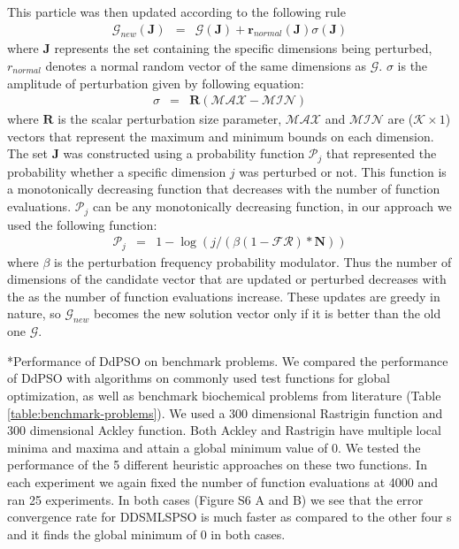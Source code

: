 \documentclass[12pt]{article}
\makeatletter
\renewcommand\subsection{\@startsection
	{subsection}{2}{0mm}
	{-0.05in}
	{-0.5\baselineskip}
	{\normalfont\normalsize\bfseries}}
\makeatother
\begin{document}
This particle was then updated according to the following rule
\begin{eqnarray}
	\mathcal{G}_{new}(\mathbf{J})& = &\mathcal{G}(\mathbf{J})+\mathbf{r}_{normal}(\mathbf{J})\sigma(\mathbf{J})
\end{eqnarray}
where $\mathbf{J}$ represents the set containing the specific dimensions being perturbed, ${r}_{normal}$ denotes a normal random vector of the same dimensions as $\mathcal{G}$. $\sigma$ is the amplitude of perturbation given by following equation:
\begin{eqnarray}
	\sigma& = &\mathbf{R}(\mathcal{MAX} -\mathcal{MIN})
\end{eqnarray}
where $\mathbf{R}$ is the scalar perturbation size parameter, $\mathcal{MAX}$ and $\mathcal{MIN}$ are ($\mathcal{K}\times{1}$) vectors that represent the maximum and minimum bounds on each dimension. The set $\mathbf{J}$ was constructed using a probability function $\mathcal{P}_{j}$ that represented the probability whether a specific dimension $j$ was perturbed or not.  This function is a monotonically decreasing function that decreases with the number of function evaluations. $\mathcal{P}_{j}$ can be any monotonically decreasing function, in our approach we used the following function:
\begin{eqnarray}
	\mathcal{P}_{j}&=&{1}-\log(j/ (\beta({1}-\mathcal{FR})*\mathbf{N}))
\end{eqnarray}
where $\beta$ is the perturbation frequency probability modulator. Thus the number of dimensions of the candidate vector that are updated or perturbed decreases with the as the number of function evaluations increase. These updates are greedy in nature, so $\mathcal{G}_{new}$ becomes the new solution vector only if it is better than the old one $\mathcal{G}$.

\subsection*{Performance of DdPSO on benchmark problems.}
We compared the performance of DdPSO with algorithms on commonly used test functions for global optimization, as well as benchmark biochemical problems from literature (Table \ref{table:benchmark-problems}). We used a 300 dimensional Rastrigin function and 300 dimensional Ackley function. Both Ackley and Rastrigin have multiple local minima and maxima and attain a global minimum value of 0. We tested the performance of the 5 different heuristic approaches on these two functions. In each experiment we again fixed the number of function evaluations at 4000 and ran 25 experiments. In both cases (Figure S6 A and B) we see that the error convergence rate for DDSMLSPSO is much faster as compared to the other four s and it finds the global minimum of 0 in both cases.
\end{document}
